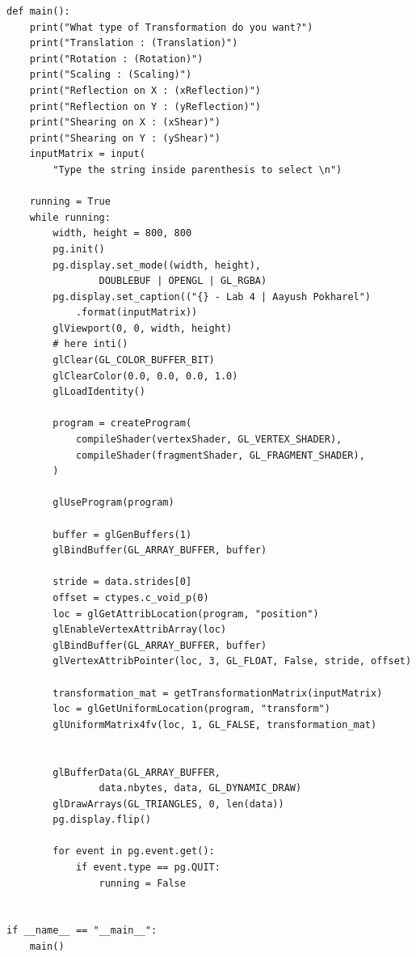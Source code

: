 \documentclass[12pt]{article}
\begin{document}
\begin{verbatim}
def main():
    print("What type of Transformation do you want?")
    print("Translation : (Translation)")
    print("Rotation : (Rotation)")
    print("Scaling : (Scaling)")
    print("Reflection on X : (xReflection)")
    print("Reflection on Y : (yReflection)")
    print("Shearing on X : (xShear)")
    print("Shearing on Y : (yShear)")
    inputMatrix = input(
        "Type the string inside parenthesis to select \n")

    running = True
    while running:
        width, height = 800, 800
        pg.init()
        pg.display.set_mode((width, height),
                DOUBLEBUF | OPENGL | GL_RGBA)
        pg.display.set_caption(("{} - Lab 4 | Aayush Pokharel")
            .format(inputMatrix))
        glViewport(0, 0, width, height)
        # here inti()
        glClear(GL_COLOR_BUFFER_BIT)
        glClearColor(0.0, 0.0, 0.0, 1.0)
        glLoadIdentity()

        program = createProgram(
            compileShader(vertexShader, GL_VERTEX_SHADER),
            compileShader(fragmentShader, GL_FRAGMENT_SHADER),
        )

        glUseProgram(program)

        buffer = glGenBuffers(1)
        glBindBuffer(GL_ARRAY_BUFFER, buffer)

        stride = data.strides[0]
        offset = ctypes.c_void_p(0)
        loc = glGetAttribLocation(program, "position")
        glEnableVertexAttribArray(loc)
        glBindBuffer(GL_ARRAY_BUFFER, buffer)
        glVertexAttribPointer(loc, 3, GL_FLOAT, False, stride, offset)

        transformation_mat = getTransformationMatrix(inputMatrix)
        loc = glGetUniformLocation(program, "transform")
        glUniformMatrix4fv(loc, 1, GL_FALSE, transformation_mat)


        glBufferData(GL_ARRAY_BUFFER,
                data.nbytes, data, GL_DYNAMIC_DRAW)
        glDrawArrays(GL_TRIANGLES, 0, len(data))
        pg.display.flip()

        for event in pg.event.get():
            if event.type == pg.QUIT:
                running = False


if __name__ == "__main__":
    main()

\end{verbatim}

\vspace*{50mm}
\end{document}
